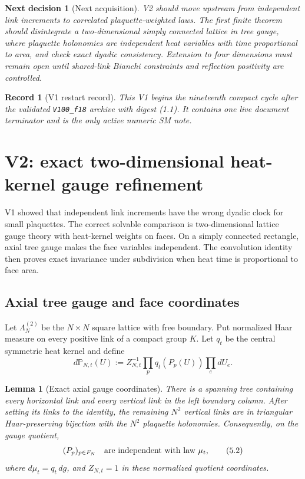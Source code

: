 \documentclass[11pt]{article}
\newtheorem{lemma}[theorem]{Lemma}
\newtheorem{decision}[theorem]{Next decision}
\newtheorem{record}[theorem]{Record}
\theoremstyle{remark}
\begin{document}
\begin{decision}[Next acquisition]
\label{dec:v19v1-next}
V2 should move upstream from independent link increments to correlated
plaquette-weighted laws.  The first finite theorem should disintegrate a
two-dimensional simply connected lattice in tree gauge, where plaquette
holonomies are independent heat variables with time proportional to area,
and check exact dyadic consistency.  Extension to four dimensions must
remain open until shared-link Bianchi constraints and reflection positivity
are controlled.
\end{decision}

\begin{record}[V1 restart record]
\label{rec:v19v1}
This V1 begins the nineteenth compact cycle after the validated
\texttt{V100\_f18} archive with digest (1.1).  It contains one live document
terminator and is the only active numeric SM note.
\end{record}


\section{V2: exact two-dimensional heat-kernel gauge refinement}
\label{sec:v19v2}

V1 showed that independent link increments have the wrong dyadic clock for
small plaquettes.  The correct solvable comparison is two-dimensional
lattice gauge theory with heat-kernel weights on faces.  On a simply
connected rectangle, axial tree gauge makes the face variables independent.
The convolution identity then proves exact invariance under subdivision
when heat time is proportional to face area.

\subsection{Axial tree gauge and face coordinates}

Let \(\Lambda_N^{(2)}\) be the \(N\times N\) square lattice with free
boundary.  Put normalized Haar measure on every positive link of a compact
group \(K\).  Let \(q_t\) be the central symmetric heat kernel and define
\[
 d{\mathbb P}_{N,t}(U)
 :=Z_{N,t}^{-1}\prod_{p}q_t(P_p(U))\prod_e dU_e.            \tag{5.1}
\]

\begin{lemma}[Exact axial gauge coordinates]
\label{lem:v19v2-axial}
There is a spanning tree containing every horizontal link and every
vertical link in the left boundary column.  After setting its links to the
identity, the remaining \(N^2\) vertical links are in triangular
Haar-preserving bijection with the \(N^2\) plaquette holonomies.
Consequently, on the gauge quotient,
\[
 (P_p)_{p\in F_N}\quad\hbox{are independent with law }\mu_t,
                                                                  \tag{5.2}
\]
where \(d\mu_t=q_t\,dg\), and \(Z_{N,t}=1\) in these normalized quotient
coordinates.
\end{lemma}
\end{document}
